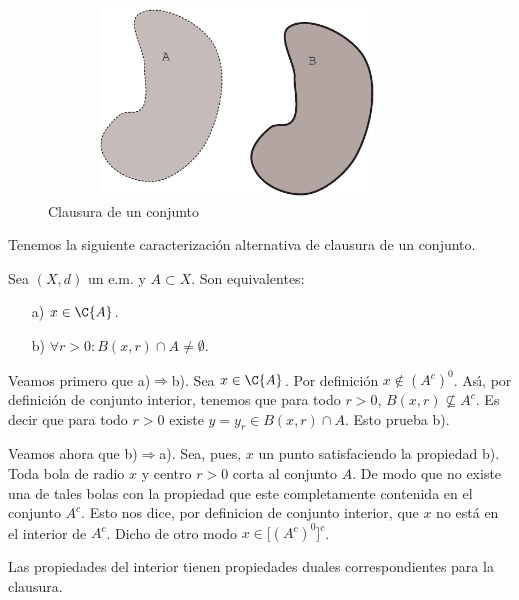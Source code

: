 \begin{figure}
\begin{center}
	\includegraphics[height=5cm, width=10cm]{clausu.eps}
	\caption{Clausura de un conjunto}\label{fig,clausura}
\end{center}
\end{figure}

Tenemos la siguiente caracterizaci\'on alternativa de clausura de
un conjunto.
\begin{proposicion}\label{pro,clausura} Sea $(X,d)$ un e.m. y $A\subset X$. Son
equivalentes:
\begin{itemize}
\item[a)] $x\in \C{A}$.
\item[b)] $\forall r>0: B(x,r)\cap A\neq\emptyset$.
\end{itemize}
\end{proposicion}
\begin{demo}Veamos primero que a)$\Rightarrow$b). Sea $x\in \C{A}$. Por
definici\'on $x\notin (A^c)^0$. As\'{\i}, por definici\'on de
conjunto interior, tenemos que para todo $r>0$, $B(x,r)\nsubseteq
A^c$. Es decir que para todo $r>0$ existe $y=y_r\in B(x,r)\cap A$.
Esto prueba b).

Veamos ahora que b)$\Rightarrow$a). Sea, pues, $x$ un punto
satisfaciendo la propiedad b). Toda bola de radio $x$ y centro
$r>0$ corta al conjunto $A$. De modo que no existe una de tales
bolas con la propiedad que este completamente contenida en el
conjunto $A^c$. Esto nos dice, por definicion de conjunto
interior, que $x$ no est\'a en el interior de $A^c$. Dicho de otro
modo $x\in \bigl[(A^c)^0\bigr]^c$.
\end{demo}

Las propiedades del interior tienen propiedades duales
correspondientes para la clausura.

